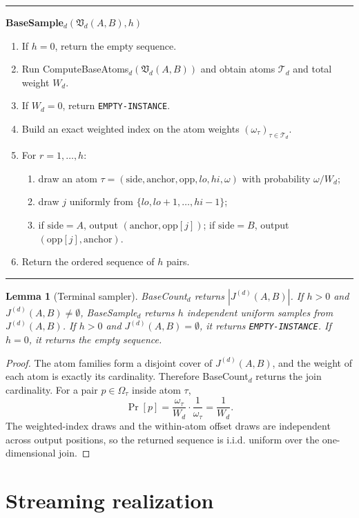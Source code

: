 \documentclass[11pt]{article}
\newcommand{\code}[1]{\texttt{#1}}
\newtheorem{lemma}[theorem]{Lemma}
\theoremstyle{definition}
\newenvironment{algorithmbox}[1]{%
  \par\medskip\noindent\hrule\smallskip
  \noindent\textbf{#1}\par\smallskip
  \begin{enumerate}[leftmargin=1.7em,itemsep=2pt,topsep=2pt]
}{%
  \end{enumerate}
  \smallskip\hrule\medskip
}
\begin{document}
\begin{algorithmbox}{BaseSample$_d(\mathfrak V_d(A,B),h)$}
\item If $h=0$, return the empty sequence.
\item Run ComputeBaseAtoms$_d(\mathfrak V_d(A,B))$ and obtain atoms $\mathcal T_d$ and total weight $W_d$.
\item If $W_d=0$, return \code{EMPTY-INSTANCE}.
\item Build an exact weighted index on the atom weights $(\omega_\tau)_{\tau\in\mathcal T_d}$.
\item For $r=1,\ldots,h$:
  \begin{enumerate}[leftmargin=1.5em,itemsep=1pt,topsep=1pt]
  \item draw an atom $\tau=(\mathrm{side},\mathrm{anchor},\mathrm{opp},lo,hi,\omega)$ with probability $\omega/W_d$;
  \item draw $j$ uniformly from $\{lo,lo+1,\ldots,hi-1\}$;
  \item if $\mathrm{side}=A$, output $(\mathrm{anchor},\mathrm{opp}[j])$; if $\mathrm{side}=B$, output $(\mathrm{opp}[j],\mathrm{anchor})$.
  \end{enumerate}
\item Return the ordered sequence of $h$ pairs.
\end{algorithmbox}

\begin{lemma}[Terminal sampler]
\label{lem:base}
BaseCount$_d$ returns $|J^{(d)}(A,B)|$.  If $h>0$ and $J^{(d)}(A,B)\ne\emptyset$, BaseSample$_d$ returns $h$ independent uniform samples from $J^{(d)}(A,B)$.  If $h>0$ and $J^{(d)}(A,B)=\emptyset$, it returns \code{EMPTY-INSTANCE}.  If $h=0$, it returns the empty sequence.
\end{lemma}

\begin{proof}
The atom families form a disjoint cover of $J^{(d)}(A,B)$, and the weight of each atom is exactly its cardinality.  Therefore BaseCount$_d$ returns the join cardinality.  For a pair $p\in\Omega_\tau$ inside atom $\tau$,
\[
  \Pr[p]=\frac{\omega_\tau}{W_d}\cdot\frac{1}{\omega_\tau}=\frac{1}{W_d}.
\]
The weighted-index draws and the within-atom offset draws are independent across output positions, so the returned sequence is i.i.d. uniform over the one-dimensional join.
\end{proof}

\section{Streaming realization}
\label{sec:streaming}
\end{document}
